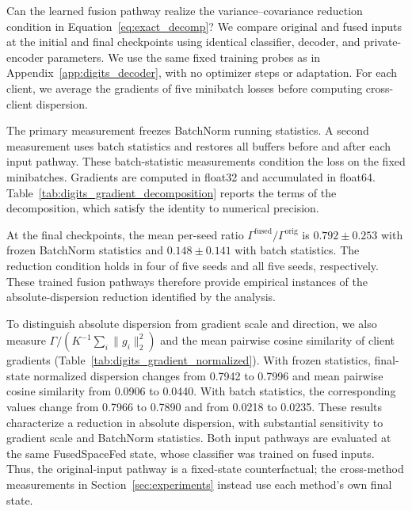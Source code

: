 Can the learned fusion pathway realize the variance--covariance reduction
condition in Equation~\eqref{eq:exact_decomp}? We compare original and fused
inputs at the initial and final checkpoints using identical classifier,
decoder, and private-encoder parameters. We use the same fixed training
probes as in Appendix~\ref{app:digits_decoder}, with no optimizer steps or
adaptation. For each client, we average the gradients of five minibatch
losses before computing cross-client dispersion.

The primary measurement freezes BatchNorm running statistics. A second
measurement uses batch statistics and restores all buffers before and after
each input pathway. These batch-statistic measurements condition the loss
on the fixed minibatches. Gradients are computed in float32 and accumulated
in float64. Table~\ref{tab:digits_gradient_decomposition} reports the terms
of the decomposition, which satisfy the identity to numerical precision.



At the final checkpoints, the mean per-seed ratio
$\Gamma^{\mathrm{fused}}/\Gamma^{\mathrm{orig}}$ is $0.792\pm0.253$
with frozen BatchNorm statistics and $0.148\pm0.141$ with batch statistics.
The reduction condition holds in four of five seeds and all five seeds,
respectively. These trained fusion pathways therefore provide empirical
instances of the absolute-dispersion reduction identified by the analysis.

To distinguish absolute dispersion from gradient scale and direction, we
also measure
$\Gamma/(K^{-1}\sum_i\|g_i\|_2^2)$ and the mean pairwise cosine similarity
of client gradients (Table~\ref{tab:digits_gradient_normalized}).
With frozen statistics, final-state normalized dispersion changes from
0.7942 to 0.7996 and mean pairwise cosine similarity from 0.0906 to 0.0440.
With batch statistics, the corresponding values change from 0.7966 to
0.7890 and from 0.0218 to 0.0235.
These results characterize a reduction in absolute dispersion, with
substantial sensitivity to gradient scale and BatchNorm statistics.
Both input pathways are evaluated at the same FusedSpaceFed state, whose
classifier was trained on fused inputs. Thus, the original-input pathway
is a fixed-state counterfactual; the cross-method measurements in
Section~\ref{sec:experiments} instead use each method's own final state.
